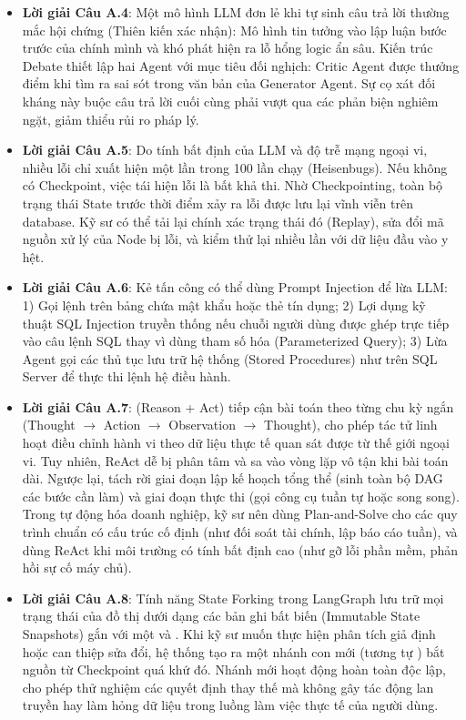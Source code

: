 \begin{itemize}
  \item \textbf{Lời giải Câu A.4}:
  Một mô hình LLM đơn lẻ khi tự sinh câu trả lời thường mắc hội chứng  (Thiên kiến xác nhận): Mô hình tin tưởng vào lập luận bước trước của chính mình và khó phát hiện ra lỗ hổng logic ẩn sâu. Kiến trúc Debate thiết lập hai Agent với mục tiêu đối nghịch: Critic Agent được thưởng điểm khi tìm ra sai sót trong văn bản của Generator Agent. Sự cọ xát đối kháng này buộc câu trả lời cuối cùng phải vượt qua các phản biện nghiêm ngặt, giảm thiểu rủi ro pháp lý.

  \item \textbf{Lời giải Câu A.5}:
  Do tính bất định của LLM và độ trễ mạng ngoại vi, nhiều lỗi chỉ xuất hiện một lần trong 100 lần chạy (Heisenbugs). Nếu không có Checkpoint, việc tái hiện lỗi là bất khả thi. Nhờ Checkpointing, toàn bộ trạng thái State trước thời điểm xảy ra lỗi được lưu lại vĩnh viễn trên database. Kỹ sư có thể tải lại chính xác trạng thái đó (Replay), sửa đổi mã nguồn xử lý của Node bị lỗi, và kiểm thử lại nhiều lần với dữ liệu đầu vào y hệt.

  \item \textbf{Lời giải Câu A.6}:
  Kẻ tấn công có thể dùng Prompt Injection để lừa LLM:
  1) Gọi lệnh  trên bảng chứa mật khẩu hoặc thẻ tín dụng;
  2) Lợi dụng kỹ thuật SQL Injection truyền thống nếu chuỗi người dùng được ghép trực tiếp vào câu lệnh SQL thay vì dùng tham số hóa (Parameterized Query);
  3) Lừa Agent gọi các thủ tục lưu trữ hệ thống (Stored Procedures) như  trên SQL Server để thực thi lệnh hệ điều hành.

  \item \textbf{Lời giải Câu A.7}:
   (Reason + Act) tiếp cận bài toán theo từng chu kỳ ngắn (Thought $\to$ Action $\to$ Observation $\to$ Thought), cho phép tác tử linh hoạt điều chỉnh hành vi theo dữ liệu thực tế quan sát được từ thế giới ngoại vi. Tuy nhiên, ReAct dễ bị phân tâm và sa vào vòng lặp vô tận khi bài toán dài. Ngược lại,  tách rời giai đoạn lập kế hoạch tổng thể (sinh toàn bộ DAG các bước cần làm) và giai đoạn thực thi (gọi công cụ tuần tự hoặc song song). Trong tự động hóa doanh nghiệp, kỹ sư nên dùng Plan-and-Solve cho các quy trình chuẩn có cấu trúc cố định (như đối soát tài chính, lập báo cáo tuần), và dùng ReAct khi môi trường có tính bất định cao (như gỡ lỗi phần mềm, phản hồi sự cố máy chủ).

  \item \textbf{Lời giải Câu A.8}:
  Tính năng State Forking trong LangGraph lưu trữ mọi trạng thái của đồ thị dưới dạng các bản ghi bất biến (Immutable State Snapshots) gắn với một  và . Khi kỹ sư muốn thực hiện phân tích giả định hoặc can thiệp sửa đổi, hệ thống tạo ra một nhánh con mới (tương tự ) bắt nguồn từ Checkpoint quá khứ đó. Nhánh mới hoạt động hoàn toàn độc lập, cho phép thử nghiệm các quyết định thay thế mà không gây tác động lan truyền hay làm hỏng dữ liệu trong luồng làm việc thực tế của người dùng.


\end{itemize}
